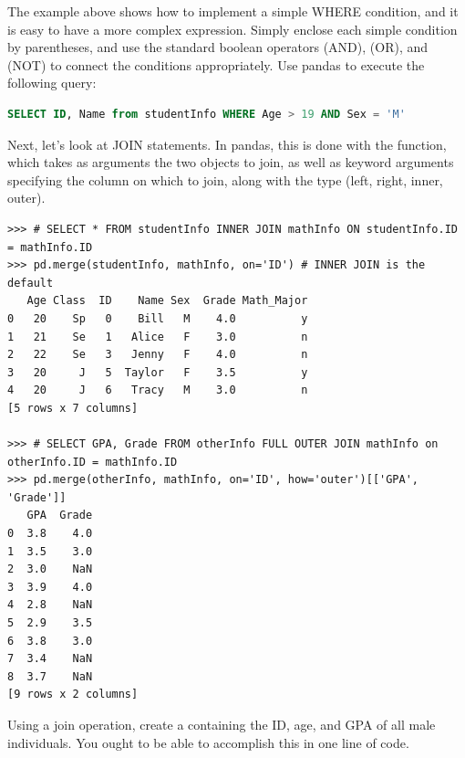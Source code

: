 \begin{problem}
The example above shows how to implement a simple WHERE condition, and it is easy
to have a more complex expression. Simply enclose each simple condition by parentheses,
and use the standard boolean operators \li{\&} (AND), \li{\|} (OR), and \li{\~} (NOT) to
connect the conditions appropriately. Use pandas to execute the following query:
\begin{lstlisting}[language=SQL]
SELECT ID, Name from studentInfo WHERE Age > 19 AND Sex = 'M'
\end{lstlisting}
\end{problem}

Next, let's look at JOIN statements. In pandas, this is done with the  function,
which takes as arguments the two  objects to join, as well as keyword arguments specifying
the column on which to join, along with the type (left, right, inner, outer).

\begin{lstlisting}
>>> # SELECT * FROM studentInfo INNER JOIN mathInfo ON studentInfo.ID = mathInfo.ID
>>> pd.merge(studentInfo, mathInfo, on='ID') # INNER JOIN is the default
   Age Class  ID    Name Sex  Grade Math_Major
0   20    Sp   0    Bill   M    4.0          y
1   21    Se   1   Alice   F    3.0          n
2   22    Se   3   Jenny   F    4.0          n
3   20     J   5  Taylor   F    3.5          y
4   20     J   6   Tracy   M    3.0          n
[5 rows x 7 columns]

>>> # SELECT GPA, Grade FROM otherInfo FULL OUTER JOIN mathInfo on otherInfo.ID = mathInfo.ID
>>> pd.merge(otherInfo, mathInfo, on='ID', how='outer')[['GPA', 'Grade']]
   GPA  Grade
0  3.8    4.0
1  3.5    3.0
2  3.0    NaN
3  3.9    4.0
4  2.8    NaN
5  2.9    3.5
6  3.8    3.0
7  3.4    NaN
8  3.7    NaN
[9 rows x 2 columns]
\end{lstlisting}

\begin{problem}
Using a join operation, create a  containing the ID, age, and GPA of all male individuals.
You ought to be able to accomplish this in one line of code.
\end{problem}

